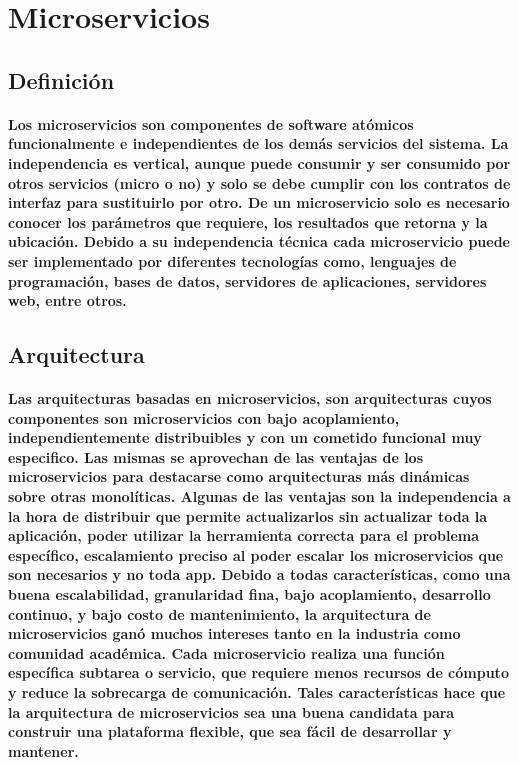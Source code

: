 \section{Microservicios}

\subsection{Definición}
\paragraph{
    Los microservicios son componentes de software atómicos funcionalmente e independientes de los demás servicios del sistema. La independencia es vertical, aunque puede consumir y ser consumido por otros servicios (micro o no) y solo se debe cumplir con los contratos de interfaz para sustituirlo por otro. De un microservicio solo es necesario conocer los parámetros que requiere, los resultados que retorna y la ubicación.
    Debido a su independencia técnica cada microservicio puede ser implementado por diferentes tecnologías como, lenguajes de programación, bases de datos, servidores de aplicaciones, servidores web, entre otros.
}

\subsection{Arquitectura}
\paragraph{
    Las arquitecturas basadas en microservicios, son arquitecturas cuyos componentes son microservicios con bajo acoplamiento, independientemente distribuibles y con un cometido funcional muy especifico.
    Las mismas se aprovechan de las ventajas de los microservicios para destacarse como arquitecturas más dinámicas sobre otras monolíticas.
    Algunas de las ventajas son la independencia a la hora de distribuir que permite actualizarlos sin actualizar toda la aplicación, poder utilizar la herramienta correcta para el problema específico, escalamiento preciso al poder escalar los microservicios que son necesarios y no toda app.
    Debido a todas características, como una buena escalabilidad, granularidad fina, bajo acoplamiento, desarrollo continuo, y bajo costo de mantenimiento, la arquitectura de microservicios ganó muchos intereses tanto en la industria como
    comunidad académica. Cada microservicio realiza una función específica subtarea o servicio, que requiere menos recursos de cómputo
    y reduce la sobrecarga de comunicación. Tales características hace que la arquitectura de microservicios sea una buena candidata para construir una plataforma flexible, que sea fácil de desarrollar y mantener.
}

